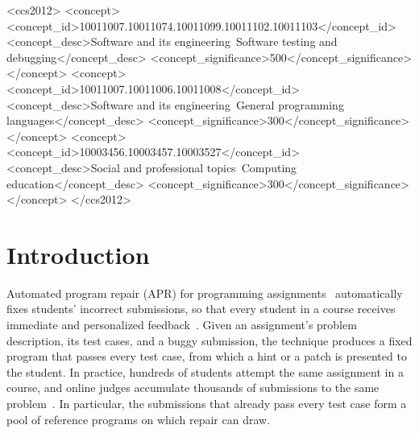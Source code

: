 \documentclass[acmsmall,screen,review,anonymous,nonacm]{acmart}
\begin{document}
\begin{CCSXML}
<ccs2012>
<concept><concept_id>10011007.10011074.10011099.10011102.10011103</concept_id>
<concept_desc>Software and its engineering~Software testing and debugging</concept_desc>
<concept_significance>500</concept_significance></concept>
<concept><concept_id>10011007.10011006.10011008</concept_id>
<concept_desc>Software and its engineering~General programming languages</concept_desc>
<concept_significance>300</concept_significance></concept>
<concept><concept_id>10003456.10003457.10003527</concept_id>
<concept_desc>Social and professional topics~Computing education</concept_desc>
<concept_significance>300</concept_significance></concept>
</ccs2012>
\end{CCSXML}


\maketitle

\section{Introduction}

Automated program repair (APR) for programming assignments~\cite{gulwani2018automated,wang2018search,hu2019re,ahmed2022verifix,zhang2024pydex} automatically fixes students' incorrect submissions, so that every student in a course receives immediate and personalized feedback~\cite{yi2017feasibility}. Given an assignment's problem description, its test cases, and a buggy submission, the technique produces a fixed program that passes every test case, from which a hint or a patch is presented to the student. In practice, hundreds of students attempt the same assignment in a course, and online judges accumulate thousands of submissions to the same problem~\cite{penedo2025codeforces}. In particular, the submissions that already pass every test case form a pool of reference programs on which repair can draw.
\end{document}

